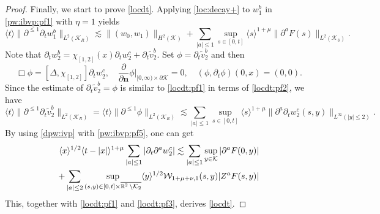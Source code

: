 \documentclass[11pt,twoside]{article}
\def\cK{\mathcal K}
\def\cW{\mathcal W}
\def\R{\mathop{\mathbb R\kern 0pt}\nolimits}
\def\p{\partial}
\def\ls{\lesssim}
\def\bn{\mathbf{n}}
\newcommand{\w}[1]{\langle {#1} \rangle}
\theoremstyle{plain}
\theoremstyle{definition}
\numberwithin{equation}{section}
\begin{document}
\begin{proof}
Finally, we start to prove \eqref{locdt}.
Applying \eqref{loc:decay+} to $w_1^b$ in \eqref{pw:ibvp:pf1} with $\eta=1$ yields
\begin{equation}\label{locdt:pf1}
\w{t}\|\p^{\le1}\p_tw_1^b\|_{L^2(\cK_R)}\ls\|(w_0,w_1)\|_{H^2(\cK)}+\sum_{|a|\le1}\sup_{s\in[0,t]}\w{s}^{1+\mu}\|\p^aF(s)\|_{L^2(\cK_3)}.
\end{equation}
Note that $\p_tw_2^b=\chi_{[1,2]}(x)\p_tw_2^c+\p_t\tilde v_2^b$.
Set $\phi=\p_t\tilde v_2^b$ and then
\begin{equation}\label{locdt:pf2}
\Box\phi=[\Delta,\chi_{[1,2]}]\p_tw_2^c,\quad \frac{\p}{\p\bn}\phi|_{[0,\infty)\times\p\cK}=0,\quad (\phi,\p_t\phi)(0,x)=(0,0).
\end{equation}
Since the estimate of $\p_t\tilde v_2^b=\phi$ is similar to \eqref{locdt:pf1} in terms of \eqref{locdt:pf2},
we have
\begin{equation}\label{locdt:pf3}
\w{t}\|\p^{\le1}\p_t\tilde v_2^b\|_{L^2(\cK_R)}=\w{t}\|\p^{\le1}\phi\|_{L^2(\cK_R)}
\ls\sum_{|a|\le1}\sup_{s\in[0,t]}\w{s}^{1+\mu}\|\p^a\p_tw_2^c(s,y)\|_{L^\infty(|y|\le2)}.
\end{equation}
By using \eqref{dpw:ivp} with \eqref{pw:ibvp:pf5}, one can get
\begin{equation*}
\begin{split}
\w{x}^{1/2}\w{t-|x|}^{1+\mu}\sum_{|a|\le1}|\p_t\p^aw_2^c|\ls\sum_{|a|\le1}\sup_{y\in\cK}|\p^aF(0,y)|\\
+\sum_{|a|\le2}\sup_{(s,y)\in[0,t]\times\overline{\R^2\setminus\cK_2}}\w{y}^{1/2}\cW_{1+\mu+\nu,1}(s,y)|Z^aF(s,y)|
\end{split}
\end{equation*}
This, together with \eqref{locdt:pf1} and \eqref{locdt:pf3}, derives \eqref{locdt}.
\end{proof}
\end{document}
